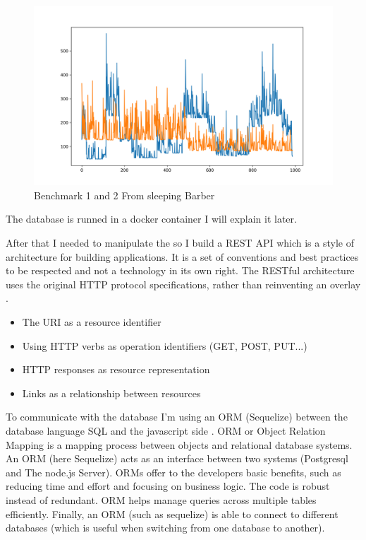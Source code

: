 \documentclass{article}
\begin{document}
\begin{figure}[h!]
    \centering
    \includegraphics[width=1\textwidth]{plot_0.png}
    \caption{Benchmark 1 and 2 From sleeping Barber}
    \label{fig:bench_1_2}
\end{figure}




The database is runned in a docker container I will explain it later.

After that I needed to manipulate the so I build a REST API which is  a style of architecture for building applications. It is a set of conventions and best practices to be respected and not a technology in its own right. The RESTful architecture uses the original HTTP protocol specifications, rather than reinventing an overlay .

\begin{itemize}
    \item The URI as a resource identifier
    \item Using HTTP verbs as operation identifiers (GET, POST, PUT...)
    \item HTTP responses as resource representation
    \item Links as a relationship between resources
\end{itemize}

To communicate with the database I'm using an ORM (Sequelize) between the database language SQL and the javascript side \cite{pereira2016working}. ORM or Object Relation Mapping is a mapping process between objects and relational database systems. An ORM (here Sequelize) acts as an interface between two systems (Postgresql and The node.js Server). ORMs offer to the developers basic benefits, such as reducing time and effort and focusing on business logic. The code is robust instead of redundant. ORM helps manage queries across multiple tables efficiently. Finally, an ORM (such as sequelize) is able to connect to different databases (which is useful when switching from one database to another).
\end{document}

